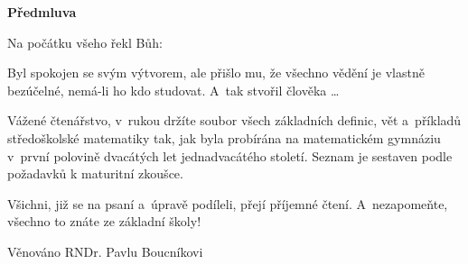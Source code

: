 
\clearpage
{}
{}
\begin{adjustwidth}{0.1\textwidth}{0.1\textwidth}
\begingroup
\null\vspace{0.2\textheight}
\begin{center}
{\bfseries\Large Předmluva}\par\vspace{2em}
\end{center}

Na počátku všeho řekl Bůh:
\begin{center}
\end{center}
Byl spokojen se svým výtvorem, ale přišlo mu, že všechno vědění je vlastně
bezúčelné, nemá-li ho kdo studovat. A~tak stvořil člověka \dots

\par Vážené čtenářstvo, v~rukou držíte soubor všech základních definic, vět
a~příkladů středoškolské matematiky tak, jak byla probírána na matematickém gymnáziu
v~první polovině dvacátých let jednadvacátého století. Seznam je sestaven podle
požadavků k maturitní zkoušce.
\par Všichni, již se na psaní a~úpravě podíleli, přejí příjemné čtení. A~nezapomeňte,
všechno to znáte ze základní školy!


\hfill Věnováno RNDr. Pavlu Boucníkovi
\endgroup
\end{adjustwidth}
\clearpage
